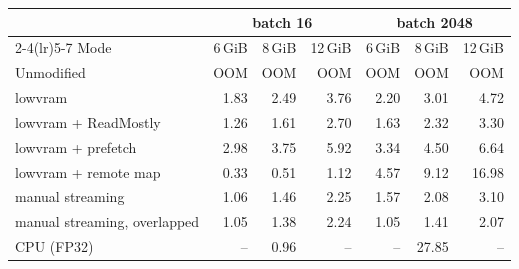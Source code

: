 \begin{tabular}{lrrrrrr}
\toprule
 & \multicolumn{3}{c}{batch 16} & \multicolumn{3}{c}{batch 2048} \\
\cmidrule(lr){2-4}\cmidrule(lr){5-7}
Mode & 6\,GiB & 8\,GiB & 12\,GiB & 6\,GiB & 8\,GiB & 12\,GiB \\
\midrule
Unmodified & OOM & OOM & OOM & OOM & OOM & OOM \\
lowvram & 1.83 & 2.49 & 3.76 & 2.20 & 3.01 & 4.72 \\
lowvram + ReadMostly & 1.26 & 1.61 & 2.70 & 1.63 & 2.32 & 3.30 \\
lowvram + prefetch & 2.98 & 3.75 & 5.92 & 3.34 & 4.50 & 6.64 \\
lowvram + remote map & 0.33 & 0.51 & 1.12 & 4.57 & 9.12 & 16.98 \\
manual streaming & 1.06 & 1.46 & 2.25 & 1.57 & 2.08 & 3.10 \\
manual streaming, overlapped & 1.05 & 1.38 & 2.24 & 1.05 & 1.41 & 2.07 \\
CPU (FP32) & -- & 0.96 & -- & -- & 27.85 & -- \\
\bottomrule
\end{tabular}
